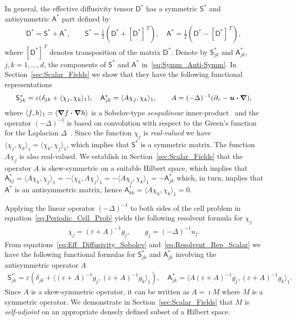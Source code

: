 \documentclass[leqno,onefignum,onetabnum]{siamltex1213}
\newcommand{\secref}[1]{Section~\ref{#1}}
\newcommand{\Dm}{\mathsf{D}}
\newcommand{\Sm}{\mathsf{S}}
\newcommand{\Am}{\mathsf{A}}
\newcommand\bnabla{\mbox{\boldmath${\nabla}$}}
\providecommand\bcdot{\boldsymbol{\cdot}}
\newcommand{\vecu}{\boldsymbol{u}}
\begin{document}
In general, the effective diffusivity tensor $\Dm^*$ has a symmetric
$\Sm^*$ and antisymmetric $\Am^*$ part defined by 
%
\begin{align}\label{eq:Symm_Anti-Symm}
  \Dm^*=\Sm^*+\Am^*,\qquad
  \Sm^*=\frac{1}{2}\left(\Dm^*+[\Dm^*]^{\,T}\right), \quad
  \Am^*=\frac{1}{2}\left(\Dm^*-[\Dm^*]^{\,T}\right),
\end{align}
%
where $[\Dm^*]^{\,T}$ denotes transposition of the matrix
$\Dm^*$. Denote by $\Sm^*_{jk}$ and $\Am^*_{jk}$, $j,k=1,\ldots,d$, the
components of $\Sm^*$ and $\Am^*$ in~\eqref{eq:Symm_Anti-Symm}. In
\secref{sec:Scalar_Fields} we show that they have the following
functional representations~\cite{Pavliotis:PHD_Thesis} 
%
\begin{align}\label{eq:Eff_Diffusivity_Sobolev}
  \Sm^*_{jk}=\varepsilon(\delta_{jk}+\langle\chi_j,\chi_k\rangle_1),
  \quad
  \Am^*_{jk}=\langle A\chi_j,\chi_k\rangle_1,
  \qquad
  A=(-\Delta)^{-1}(\partial_\tau-\vecu \bcdot\bnabla),
\end{align}
%
where $\langle f,h\rangle_1=\langle\bnabla f\bcdot\bnabla h\rangle$ is a Sobelov-type
\emph{sesquilinear} inner-product~\cite{McOwen:2003:PDE} and the
operator $(-\Delta)^{-1}$ is based on convolution with respect to the
Green's function for the Laplacian $\Delta$~\cite{Stakgold:BVP:2000}.  
Since the function $\chi_j$ is
\emph{real-valued} we have $\langle\chi_j,\chi_k\rangle_1=\langle\chi_k,\chi_j\rangle_1$, which implies that
$\Sm^*$ is a symmetric matrix. The function $A\chi_j$ is also
real-valued. We establish in \secref{sec:Scalar_Fields} that the
operator $A$ is skew-symmetric on a suitable Hilbert space, which
implies that
$\Am^*_{kj}=\langle A\chi_k,\chi_j\rangle_1=-\langle\chi_k,A\chi_j\rangle_1=-\langle A\chi_j,\chi_k\rangle_1=-\Am^*_{jk}$
which, in turn, implies that $\Am^*$ is an antisymmetric matrix, hence
$\Am^*_{kk}=\langle A\chi_k,\chi_k\rangle_1=0$.  



Applying the linear operator $(-\Delta)^{-1}$ to both sides of the cell
problem in equation~\eqref{eq:Periodic_Cell_Prob} yields the following
resolvent formula for $\chi_j$
%
\begin{align}\label{eq:Resolvent_Rep_Scalar}
  \chi_j=(\varepsilon+A)^{-1}g_j, \qquad 
  g_j=(-\Delta)^{-1}u_j.
\end{align}
%
From equations~\eqref{eq:Eff_Diffusivity_Sobolev}
and~\eqref{eq:Resolvent_Rep_Scalar} we have the following functional
formulas for $\Sm^*_{jk}$ and $\Am^*_{jk}$ involving the
antisymmetric operator $A$
%
\begin{align}\label{eq:Eff_Diff_Resolvent_Sobolev}
 \Sm^*_{jk}=\varepsilon\left(\delta_{jk}
  +\langle(\varepsilon+A)^{-1}g_j,(\varepsilon+A)^{-1}g_k\rangle_1\right), 
  \quad
 \Am^*_{jk}=\langle A(\varepsilon+A)^{-1}g_j,(\varepsilon+A)^{-1}g_k\rangle_1.
\end{align}
%
Since $A$ is a skew-symmetric operator, it can be written as $A=\imath M$
where $M$ is a symmetric operator. We demonstrate in
\secref{sec:Scalar_Fields} that $M$ is \emph{self-adjoint} on an
appropriate densely defined subset of a Hilbert space.
\end{document}
